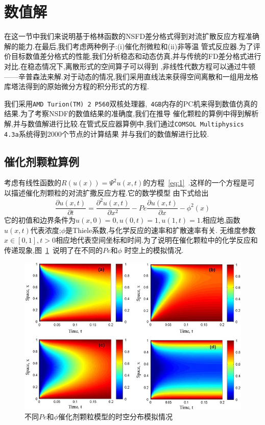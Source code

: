 \documentclass[a4paper,cs4size,adobefonts,cm-default,no-math]{ctexart}
\begin{document}
\section{数值解}
在这一节中我们来说明基于格林函数的NSFD差分格式得到对流扩散反应方程准确解的能力.在最后,我们考虑两种例子:(i)催化剂微粒和(ii)非等温
管式反应器.为了评价目标数值差分格式的性能,我们分析稳态和动态仿真,并与传统的FD差分格式进行对比.在稳态情况下,离散形式的空间算子可以得到
,非线性代数方程可以通过牛顿——辛普森法来解.对于动态的情况,我们采用直线法来获得空间离散和一组用龙格库塔法得到的原始微分方程的积分形式的方程.\par
我们采用\texttt{AMD Turion(TM) 2 P560}双核处理器,~\texttt{4GB}内存的PC机来得到数值仿真的结果.为了考察NSDF的数值结果的准确度,我们在推导
催化颗粒的算例中得到解析解,并与数值解进行比较.在管式反应器算例中,我们通过\texttt{COMSOL Multiphysics 4.3a}系统得到2000个节点的计算结果
并与我们的数值解进行比较.
\subsection{催化剂颗粒算例}
考虑有线性函数的$R(u(x))=\Psi^2 u(x,t)$的方程~\ref{eq:1}~.这样的一个方程是可以描述催化剂颗粒的对流扩撒反应方程.它的数学模型
由下式给出
\begin{equation}\label{eq:23}
 \dfrac{\partial u(x,t)}{\partial t}=\dfrac{\partial^2 u(x,t)}{\partial x^2}-Pe\dfrac{\partial u(x,t)}{\partial x}
 -\phi^2(x)
\end{equation}
它的初值和边界条件为$u(x,0)=0,u(0,t)=1,u(1,t)=1$.相应地,函数$u(x,t)$代表浓度;$\phi$是Thiele系数,与化学反应的速率和扩散速率有关.
无维度参数$x\in[0,1],t>0$相应地代表空间坐标和时间.为了说明在催化颗粒中的化学反应和传递现象,图~\ref{fig:1}~说明了在不同的$Pe$和$\phi$
时空上的模拟情况.
\begin{figure}
 \centering
 \includegraphics[scale=0.7]{./pic/1.jpg}
 \caption{不同$Pe$和$\phi$催化剂颗粒模型的时空分布模拟情况}\label{fig:1}
\end{figure}
\end{document}
